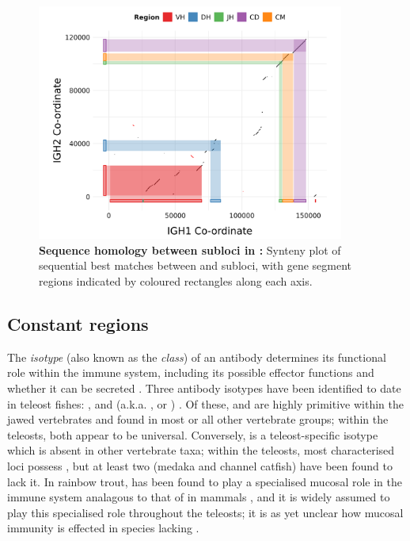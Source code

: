 \begin{figure}
	\centering
	\includegraphics[width=0.9\textwidth]{_Figures/png/nfu-locus-dots}
	\caption[Sequence homology between subloci in \Nfu \igh{}]{\textbf{Sequence homology between subloci in \Nfu \igh{}:} Synteny plot of sequential best matches between  and  subloci, with gene segment regions indicated by coloured rectangles along each axis.}
	\label{fig:nfu-locus-synteny}
\end{figure}
	
	\subsection{Constant regions}
	\label{sec:nfu-locus-constant}
	
	The \textit{isotype} (also known as the \textit{class}) of an antibody determines its functional role within the immune system, including its possible effector functions and whether it can be secreted \parencite{schroeder2010immunoglobulins}. Three antibody isotypes have been identified to date in teleost fishes: ,  and  (a.k.a. ,  or ) \parencite{fillatreau2013astonishing,bengten2015fishantibodies,magadan2015fishrepertoires}. Of these,  and  are highly primitive within the jawed vertebrates and found in most or all other vertebrate groups; within the teleosts, both appear to be universal. Conversely,  is a teleost-specific isotype which is absent in other vertebrate taxa; within the teleosts, most characterised \igh{} loci possess , but at least two (medaka and channel catfish) have been found to lack it. In rainbow trout,  has been found to play a specialised mucosal role in the immune system analagous to that of  in mammals \parencite{zhang2010igtgut,xu2013igtskin}, and it is widely assumed to play this specialised role throughout the teleosts; it is as yet unclear how mucosal immunity is effected in species lacking .
	

